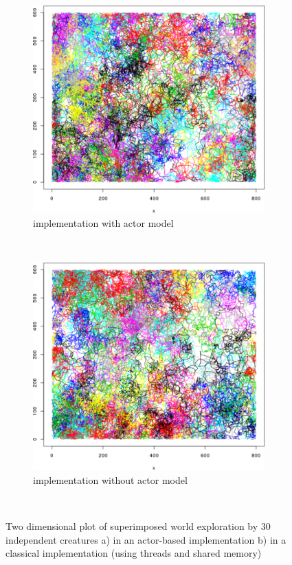 \documentclass{aamas2017}
\begin{document}
\begin{figure}[!ht]
	\centering
	\begin{subfigure}[t]{0.5\textwidth}
		\centering
		\includegraphics[height=8cm]{images/tracingAkka}
		\caption{implementation with actor model}
		\label{trace:akka}
	\end{subfigure}%
	~ 
	\begin{subfigure}[t]{0.5\textwidth}
		\centering
		\includegraphics[height=8cm]{images/tracingNoAkka}
		\caption{implementation without actor model}
		\label{trace:noAkka}
	\end{subfigure}%
	~
	\caption{Two dimensional plot of superimposed world exploration by 30 independent creatures a) in an actor-based implementation b) in a classical implementation (using threads and shared memory) }
	\label{tracing}
\end{figure}
\end{document}
